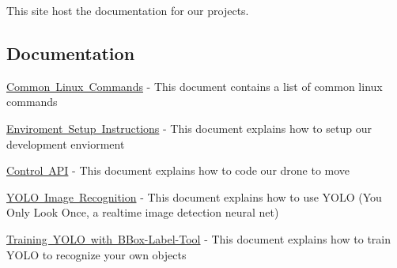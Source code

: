 This site host the documentation for our projects.

\subsection*{Documentation}

\mbox{\hyperlink{md_linux_commands}{Common Linux Commands}} -\/ This document contains a list of common linux commands

\mbox{\hyperlink{md_enviorment_setup}{Enviroment Setup Instructions}} -\/ This document explains how to setup our development enviorment

\mbox{\hyperlink{md_control_api_tutorial}{Control A\+PI}} -\/ This document explains how to code our drone to move

\mbox{\hyperlink{md_yolo}{Y\+O\+LO Image Recognition}} -\/ This document explains how to use Y\+O\+LO (You Only Look Once, a realtime image detection neural net)

\mbox{\hyperlink{md_yoloTraining}{Training Y\+O\+LO with B\+Box-\/\+Label-\/\+Tool}} -\/ This document explains how to train Y\+O\+LO to recognize your own objects 